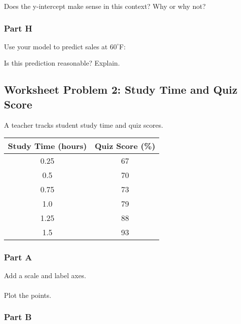 \documentclass[12pt]{article}
\begin{document}
				Does the y-intercept make sense in this context? Why or why not?

				\vspace{3cm}

			\subsubsection*{Part H}
			
				Use your model to predict sales at $60^\circ$F:

				\vspace{2cm}

				Is this prediction reasonable? Explain.

				\vspace{2cm}

				\newpage

		\subsection*{Worksheet Problem 2: Study Time and Quiz Score}

			A teacher tracks student study time and quiz scores.

			\begin{center}
				\begin{tabular}{|c|c|}
					\hline
					Study Time (hours) & Quiz Score (\%) \\
					\hline
					0.25 & 67 \\
					0.5 & 70 \\
					0.75 & 73 \\
					1.0 & 79 \\
					1.25 & 88 \\
					1.5 & 93 \\
					\hline
				\end{tabular}
			\end{center}

			\subsubsection*{Part A}
			
				Add a scale and label axes.\\\\
				Plot the points.

				\vspace{8cm}

			\subsubsection*{Part B}
\end{document}
